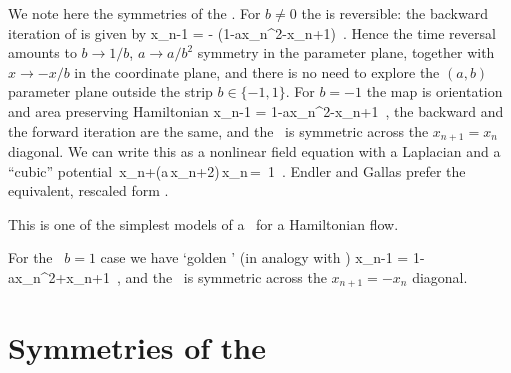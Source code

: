 We note here the symmetries of the {\HenonMap}
.
For $b \neq 0$ the  {\HenonMap} is reversible:
the backward iteration of  is given by
\beq
  x_{n-1} = - (1-ax_n^2-x_{n+1})
\,.
Hence the time reversal amounts to $b \rightarrow 1/b$,
$a \rightarrow a/b^2$ symmetry in the parameter plane, together
with $x \rightarrow -x/b$ in the coordinate plane, and there is
no need to explore the $(a,b)$ parameter plane outside the strip
$b \in \{-1, 1\}$.
For $b=-1$ the map is orientation and area preserving
Hamiltonian {\HenonMap} %
\beq
  x_{n-1} = 1-ax_n^2-x_{n+1}
\,,
the backward and the forward iteration are the same, and the \nws\ is
symmetric across the $x_{n+1} = x_n$ diagonal. We can write this as a
nonlinear field equation with a Laplacian  and a
``cubic'' potential 
\beq
\Box\,x_{n}+(a\,x_{n}+2)\,x_{n}\,=\, 1
\,.
Endler and Gallas prefer the equivalent, rescaled form
.

This is one of the simplest models of a \PoincMap\ for a Hamiltonian flow.

For the \orev\ $b=1$ case we have `golden \Henon' (in analogy with )
\beq
  x_{n-1} = 1-ax_n^2+x_{n+1}
\,,
and the \nws\ is symmetric across the $x_{n+1}=-x_n$ diagonal.

  

\section{Symmetries of the \topp}
\label{c-symbol-plane}


